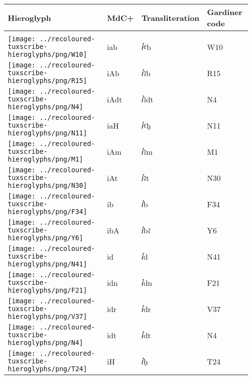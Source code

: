 \begin{center}
	\begin{tabularx}{\linewidth}{YYYY}
		Hieroglyph & MdC+ & Transliteration & Gardiner code\\
		\hline\\
		\texttt{[image: ../recoloured-tuxscribe-hieroglyphs/png/W10]} & iab & ꞽꜥb & W10 \\ 
		\texttt{[image: ../recoloured-tuxscribe-hieroglyphs/png/R15]} & iAb & ꞽꜣb & R15 \\ 
		\texttt{[image: ../recoloured-tuxscribe-hieroglyphs/png/N4]} & iAdt & ꞽꜣdt & N4 \\ 
		\texttt{[image: ../recoloured-tuxscribe-hieroglyphs/png/N11]} & iaH & ꞽꜥḥ & N11 \\ 
		\texttt{[image: ../recoloured-tuxscribe-hieroglyphs/png/M1]} & iAm & ꞽꜣm & M1 \\ 
		\texttt{[image: ../recoloured-tuxscribe-hieroglyphs/png/N30]} & iAt & ꞽꜣt & N30 \\ 
		\texttt{[image: ../recoloured-tuxscribe-hieroglyphs/png/F34]} & ib & ꞽb & F34 \\ 
		\texttt{[image: ../recoloured-tuxscribe-hieroglyphs/png/Y6]} & ibA & ꞽbꜣ & Y6 \\ 
		\texttt{[image: ../recoloured-tuxscribe-hieroglyphs/png/N41]} & id & ꞽd & N41 \\ 
		\texttt{[image: ../recoloured-tuxscribe-hieroglyphs/png/F21]} & idn & ꞽdn & F21 \\ 
		\texttt{[image: ../recoloured-tuxscribe-hieroglyphs/png/V37]} & idr & ꞽdr & V37 \\ 
		\texttt{[image: ../recoloured-tuxscribe-hieroglyphs/png/N4]} & idt & ꞽdt & N4 \\ 
		\texttt{[image: ../recoloured-tuxscribe-hieroglyphs/png/T24]} & iH & ꞽḥ & T24 \\ 
	\end{tabularx}
\end{center}


